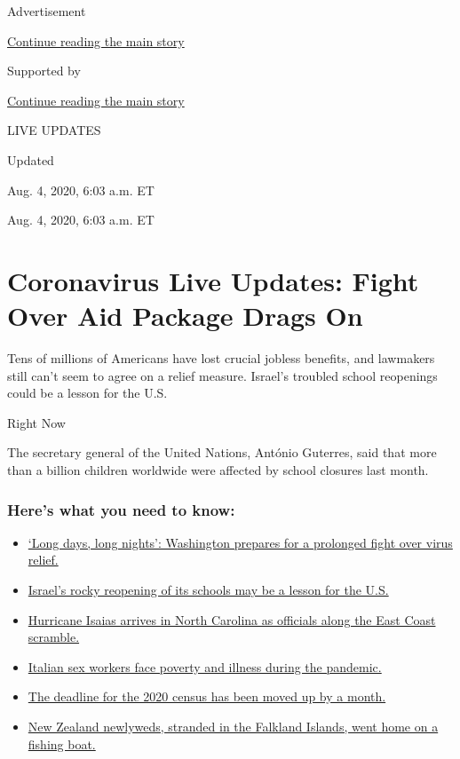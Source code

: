 Advertisement

\protect\hyperlink{after-top}{Continue reading the main story}

Supported by

\protect\hyperlink{after-sponsor}{Continue reading the main story}

LIVE UPDATES

Updated~

Aug. 4, 2020, 6:03 a.m. ET

Aug. 4, 2020, 6:03 a.m. ET

\hypertarget{coronavirus-live-updates-fight-over-aid-package-drags-on}{%
\section{Coronavirus Live Updates: Fight Over Aid Package Drags
On}\label{coronavirus-live-updates-fight-over-aid-package-drags-on}}

Tens of millions of Americans have lost crucial jobless benefits, and
lawmakers still can't seem to agree on a relief measure. Israel's
troubled school reopenings could be a lesson for the U.S.

Right Now

The secretary general of the United Nations, António Guterres, said that
more than a billion children worldwide were affected by school closures
last month.

\hypertarget{heres-what-you-need-to-know}{%
\subsubsection{Here's what you need to
know:}\label{heres-what-you-need-to-know}}

\begin{itemize}
\tightlist
\item
  \protect\hyperlink{link-6b644638}{`Long days, long nights': Washington
  prepares for a prolonged fight over virus relief.}
\item
  \protect\hyperlink{link-7af9fca0}{Israel's rocky reopening of its
  schools may be a lesson for the U.S.}
\item
  \protect\hyperlink{link-33bf9168}{Hurricane Isaias arrives in North
  Carolina as officials along the East Coast scramble.}
\item
  \protect\hyperlink{link-6bfd36ea}{Italian sex workers face poverty and
  illness during the pandemic.}
\item
  \protect\hyperlink{link-3bc78c4}{The deadline for the 2020 census has
  been moved up by a month.}
\item
  \protect\hyperlink{link-bfeb498}{New Zealand newlyweds, stranded in
  the Falkland Islands, went home on a fishing boat.}
\end{itemize}


